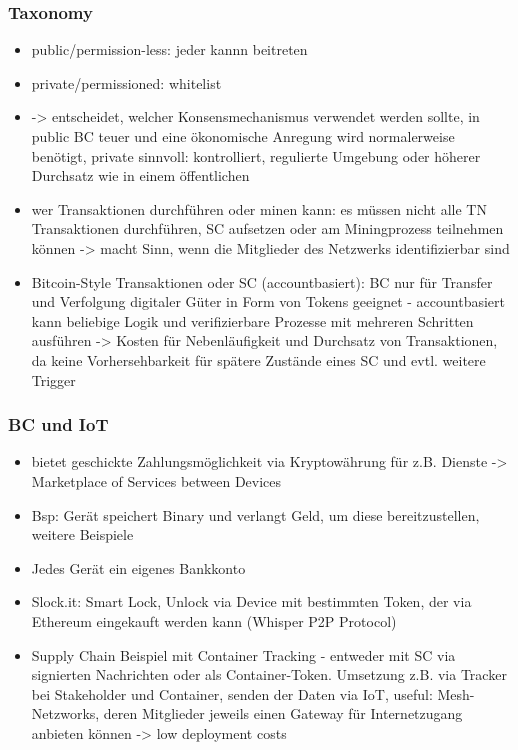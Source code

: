     \subsubsection*{Taxonomy}
        \begin{itemize}
            \item public/permission-less: jeder kannn beitreten
            \item private/permissioned: whitelist
            \item -> entscheidet, welcher Konsensmechanismus verwendet werden sollte, in public BC teuer und eine ökonomische Anregung wird normalerweise benötigt, private sinnvoll: kontrolliert, regulierte Umgebung oder höherer Durchsatz wie in einem öffentlichen
            \item wer Transaktionen durchführen oder minen kann: es müssen nicht alle TN Transaktionen durchführen, SC aufsetzen oder am Miningprozess teilnehmen können -> macht Sinn, wenn die Mitglieder des Netzwerks identifizierbar sind
            \item Bitcoin-Style Transaktionen oder SC (accountbasiert): BC nur für Transfer und Verfolgung digitaler Güter in Form von Tokens geeignet - accountbasiert kann beliebige Logik und verifizierbare Prozesse mit mehreren Schritten ausführen -> Kosten für Nebenläufigkeit und Durchsatz von Transaktionen, da keine Vorhersehbarkeit für spätere Zustände eines SC und evtl. weitere Trigger
        \end{itemize}
        
    \subsubsection*{BC und IoT}
        \begin{itemize}
            \item bietet geschickte Zahlungsmöglichkeit via Kryptowährung für z.B. Dienste -> Marketplace of Services between Devices
            \item Bsp: Gerät speichert Binary und verlangt Geld, um diese bereitzustellen, weitere Beispiele
            \item Jedes Gerät ein eigenes Bankkonto
            \item Slock.it: Smart Lock, Unlock via Device mit bestimmten Token, der via Ethereum eingekauft werden kann (Whisper P2P Protocol)
            \item Supply Chain Beispiel mit Container Tracking - entweder mit SC via signierten Nachrichten oder als Container-Token. Umsetzung z.B. via Tracker bei Stakeholder und Container, senden der Daten via IoT, useful: Mesh-Netzworks, deren Mitglieder jeweils einen Gateway für Internetzugang anbieten können -> low deployment costs
        \end{itemize}
        
